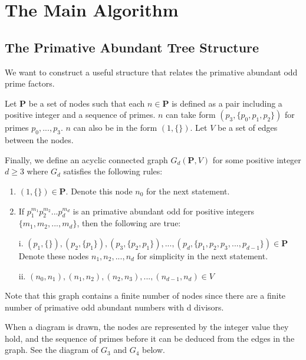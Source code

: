 \documentclass[../paper.tex]{subfiles}
\begin{document}
\section{The Main Algorithm}

\subsection{The Primative Abundant Tree Structure}

We want to construct a useful structure that relates the primative
abundant odd prime factors. 

Let $\mathbf{P}$ be a set of nodes such that each $n \in 
\mathbf{P}$ is defined as a pair including a positive integer 
and a sequence of primes. $n$ can take form 
$(p_3, \{p_0, p_1, p_2\})$ for primes $p_0,..., p_3$. 
$n$ can also be in the form $(1, \{\})$. Let $V$ be a set of 
edges between the nodes.

Finally, we define an acyclic connected graph $G_d(\mathbf{P},V)$ 
for some positive integer $d \geq 3$ where $G_d$ satisfies the 
following rules: 

\begin{enumerate}

\item $(1, \{\}) \in \mathbf{P}$. Denote this node $n_0$ for the next 
      statement.

\item If $p_1^{m_1}p_2^{m_2}...p_d^{m_d}$ is an primative abundant 
      odd for positive integers $\{m_1, m_2, ..., m_d\}$, then
			the following are true: 

      i. $ (p_1, \{\}), (p_2, \{p_1\}), (p_3, \{p_2, p_1\}), ..., 
        (p_d, \{p_1, p_2, p_3, ..., p_{d-1}\}) \in \mathbf{P} $
			Denote these nodes $n_1, n_2, ..., n_d$ for simplicity in the 
			next statement.

      ii. $ (n_0, n_1), (n_1, n_2), (n_2, n_3), ..., (n_{d-1}, n_{d}) 
      \in V $

\end{enumerate}

Note that this graph contains a finite number of nodes since 
there are a finite number of primative odd abundant numbers with
d divisors. 

When a diagram is drawn, the nodes are represented by the integer 
value they hold, and the sequence of primes before it can be deduced
from the edges in the graph. See the diagram of $G_3$ and $G_4$
below.
\end{document}
